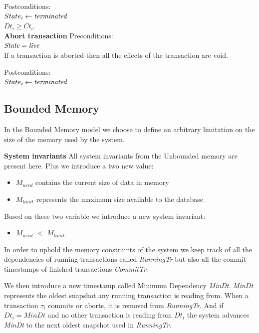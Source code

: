\documentclass[parallelisme]{compas2022}
\begin{document}
Postconditions:\\
$State_i \leftarrow \emph{terminated}$ \\
$Dt_i \geq Ct_i$.\\



\textbf{Abort transaction}
Preconditions:\\ 
$\emph{State} = \emph{live}$ \\

If a transaction is aborted then all the effects of the transaction are void.

Postconditions:\\
$State_i \leftarrow \emph{terminated}$ \\

\subsection{Bounded Memory}

In the Bounded Memory model we choose to define an arbitrary limitation on the size of the memory used by the system.

\textbf{System invariants}
All system invariants from the Unbounded memory are present here.
Plus we introduce a two new value:
\begin{itemize}
  \item \emph{$M_{used}$} contains the current size of data in memory
  \item \emph{$M_{limit}$} represents the maximum size available to the database
\end{itemize}
Based on these two variable we introduce a new system invariant:
\begin{itemize}
  \item \emph{$M_{used}$} $<$ \emph{$M_{limit}$}
\end{itemize}
In order to uphold the memory constraints of the system we keep track of all the dependencies of running transactions called \emph{RunningTr} but also all the commit timestamps of finished transactions \emph{CommitTr}.

We then introduce a new timestamp called Minimum Dependency \emph{MinDt}.
\emph{MinDt} represents the oldest snapshot any running transaction is reading from.
When a transaction $\tau_i$ commits or aborts, it is removed from \emph{RunningTr}. 
And if $Dt_i = MinDt$ and no other transaction is reading from $Dt_i$ the system advances \emph{MinDt} to the next oldest snapshot used in \emph{RunningTr}.
\end{document}
